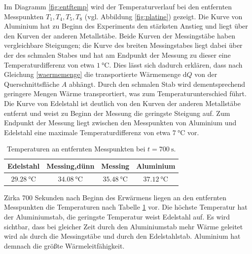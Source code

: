 Im Diagramm \ref{fig:entftemp} wird der Temperaturverlauf bei den entfernten Messpunkten $T_1, T_4, T_5, T_8$ (vgl. Abbildung \ref{fig:platine}) gezeigt. 
Die Kurve von Aluminium hat zu Beginn des Experiments den stärksten Anstieg und liegt über den Kurven der anderen Metallstäbe. 
Beide Kurven der Messingstäbe haben vergleichbare Steigungen;
die Kurve des breiten Messingstabes liegt dabei über der des schmalen Stabes und hat am Endpunkt der Messung zu dieser eine Temperaturdifferenz von etwa $\SI{1}{\degreeCelsius}$.
Dies lässt sich dadurch erklären, dass nach Gleichung \eqref{waermemenge} die transportierte Wärmemenge $\mathup{d}Q$ von der Querschnittsfläche $A$ abhängt.
Durch den schmalen Stab wird dementsprechend geringere Mengen Wärme transprortiert, was zum Temperaturunterschied führt.
Die Kurve von Edelstahl ist deutlich von den Kurven der anderen Metallstäbe entfernt und weist zu Beginn der Messung die geringste Steigung auf. 
Zum Endpunkt der Messung liegt zwischen den Messpunkten von Aluminium und Edelstahl eine maximale Temperaturdifferenz von etwa $\SI{7}{\degreeCelsius}$ vor. 
\begin{table}
	\centering
	\begin{tabular}{cccc}
	\toprule
	{Edelstahl}&{Messing,dünn}&{Messing}&{Aluminium}\\
	\midrule
	$\SI{29.28}{\degreeCelsius}$& $\SI{34.08}{\degreeCelsius}$& $\SI{35.48}{\degreeCelsius}$& $\SI{37.12}{\degreeCelsius}$\\
	\bottomrule
	\end{tabular}
	\caption{Temperaturen an entfernten Messpunkten bei $t=\SI{700}{\second}$.}
	\label{tab:700}
\end{table}

Zirka 700 Sekunden nach Beginn des Erwärmens liegen an den entfernten Messpunkten die Temperaturen nach Tabelle \ref{tab:700} vor. Die höchste Temperatur hat der Aluminiumstab, die geringste Temperatur weist Edelstahl auf.
Es wird sichtbar, dass bei gleicher Zeit durch den Aluminiumstab mehr Wärme geleitet wird als durch die Messingstäbe und durch den Edelstahlstab. 
Aluminium hat demnach die größte Wärmeleitfähigkeit.\\

